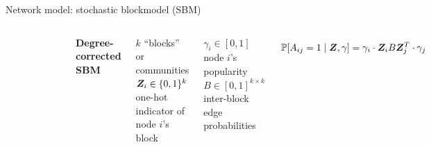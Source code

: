 \documentclass{beamer}
\theoremstyle{remark}
\newcommand{\Z}{\bm Z}
\DeclarePairedDelimiter{\set}{\{}{\}}
\DeclarePairedDelimiter{\brac}{[}{]}
\renewcommand{\P}[2][]{%
   \ifthenelse{ \equal{#1}{} }
      {\ensuremath{\mathbb{P} \brac*{#2}}}
      {\ensuremath{\mathbb{P} \brac*{#2 \mid #1}}}
}
\begin{document}
\begin{frame}{Network model: stochastic blockmodel (SBM)}
    \begin{columns}

        \begin{figure}
            \includegraphics[width=\textwidth]{figures/assortative.png}
        \end{figure}


        \textbf{Degree-corrected SBM}

        \vspace{4mm}

        $k$ ``blocks'' or communities
        $\Z_i \in \set{0, 1}^k$ one-hot indicator of node $i$'s block

        \vspace{3mm}

        $\gamma_i \in [0, 1]$ node $i$'s popularity
        $B \in [0, 1]^{k \times k}$ inter-block edge probabilities

        \begin{align*}
            \P[\Z, \gamma]{A_{ij} = 1} = \gamma_i \cdot \Z_i B \Z_j^T \cdot \gamma_j
        \end{align*}

    \end{columns}
\end{frame}
\end{document}
